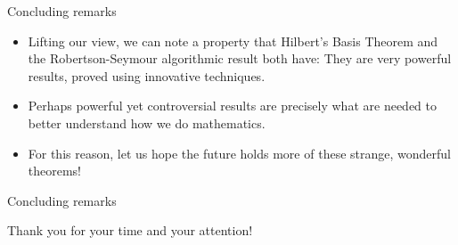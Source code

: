 \begin{frame}{Concluding remarks}
   \begin{itemize}
  \item { 
  Lifting our view, we can note a property that Hilbert's Basis Theorem and the Robertson-Seymour algorithmic result both have: They are very powerful results, proved using innovative techniques.
  } \pause
  \item { 
  Perhaps powerful yet controversial results are precisely what are needed to better understand how we do mathematics. 
  } \pause
  \item {
  For this reason, let us hope the future holds
  more of these strange, wonderful theorems!
  } 
  \end{itemize}
\end{frame}




\begin{frame}{Concluding remarks}
\begin{center}
  \Large{Thank you for your time and your attention!}
\end{center}
\end{frame}







